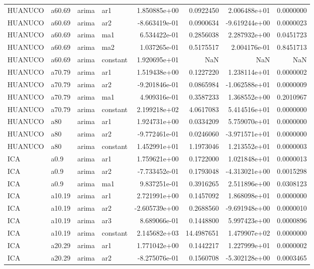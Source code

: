 \documentclass[
]{article}
\begin{document}
\begin{table}[!h]
\begin{tabular}[t]{llllrrrr}
HUANUCO & a60.69 & arima & ar1 & 1.850885e+00 & 0.0922450 & 2.006488e+01 & 0.0000000\\
HUANUCO & a60.69 & arima & ar2 & -8.663419e-01 & 0.0900634 & -9.619244e+00 & 0.0000023\\
HUANUCO & a60.69 & arima & ma1 & 6.534422e-01 & 0.2856038 & 2.287932e+00 & 0.0451723\\
\addlinespace
HUANUCO & a60.69 & arima & ma2 & 1.037265e-01 & 0.5175517 & 2.004176e-01 & 0.8451713\\
HUANUCO & a60.69 & arima & constant & 1.920695e+01 & NaN & NaN & NaN\\
HUANUCO & a70.79 & arima & ar1 & 1.519438e+00 & 0.1227220 & 1.238114e+01 & 0.0000002\\
HUANUCO & a70.79 & arima & ar2 & -9.201846e-01 & 0.0865984 & -1.062588e+01 & 0.0000009\\
HUANUCO & a70.79 & arima & ma1 & 4.909316e-01 & 0.3587233 & 1.368552e+00 & 0.2010967\\
\addlinespace
HUANUCO & a70.79 & arima & constant & 2.199218e+02 & 4.0617083 & 5.414516e+01 & 0.0000000\\
HUANUCO & a80 & arima & ar1 & 1.924731e+00 & 0.0334209 & 5.759070e+01 & 0.0000000\\
HUANUCO & a80 & arima & ar2 & -9.772461e-01 & 0.0246060 & -3.971571e+01 & 0.0000000\\
HUANUCO & a80 & arima & constant & 1.452991e+01 & 1.1973046 & 1.213552e+01 & 0.0000003\\
ICA & a0.9 & arima & ar1 & 1.759621e+00 & 0.1722000 & 1.021848e+01 & 0.0000013\\
\addlinespace
ICA & a0.9 & arima & ar2 & -7.733452e-01 & 0.1793048 & -4.313021e+00 & 0.0015298\\
ICA & a0.9 & arima & ma1 & 9.837251e-01 & 0.3916265 & 2.511896e+00 & 0.0308123\\
ICA & a10.19 & arima & ar1 & 2.721991e+00 & 0.1457092 & 1.868098e+01 & 0.0000000\\
ICA & a10.19 & arima & ar2 & -2.605739e+00 & 0.2688560 & -9.691948e+00 & 0.0000010\\
ICA & a10.19 & arima & ar3 & 8.689066e-01 & 0.1448800 & 5.997423e+00 & 0.0000896\\
\addlinespace
ICA & a10.19 & arima & constant & 2.145682e+03 & 14.4987651 & 1.479907e+02 & 0.0000000\\
ICA & a20.29 & arima & ar1 & 1.771042e+00 & 0.1442217 & 1.227999e+01 & 0.0000002\\
ICA & a20.29 & arima & ar2 & -8.275076e-01 & 0.1560708 & -5.302128e+00 & 0.0003465\\

\end{tabular}
\end{table}
\end{document}
